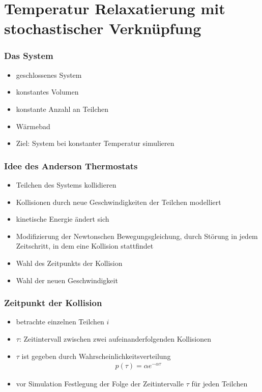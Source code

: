 \documentclass{beamer}
\begin{document}
\section{Temperatur Relaxatierung mit stochastischer Verknüpfung}
\begin{frame}
	\frametitle{Das System}
	\begin{itemize}
		\item geschlossenes System
		\item konstantes Volumen
		\item konstante Anzahl an Teilchen	
		\item Wärmebad
		\item Ziel: System bei konstanter Temperatur simulieren
	\end{itemize}
\end{frame}

\begin{frame} 
	\frametitle{Idee des Anderson Thermostats} 
	\begin{itemize}
		\item Teilchen des Systems kollidieren
		\item Kollisionen durch neue Geschwindigkeiten der Teilchen modelliert
		\item kinetische Energie ändert sich
		\item Modifizierung der Newtonschen Bewegungsgleichung, durch Störung  in jedem Zeitschritt, in dem eine Kollision stattfindet
		\item Wahl des Zeitpunkts der Kollision
		\item Wahl der neuen Geschwindigkeit
	\end{itemize}
\end{frame}

\begin{frame} 
	\frametitle{Zeitpunkt der Kollision}
	\begin{itemize}
		\item betrachte einzelnen Teilchen $i$
		\item $\tau$: Zeitintervall zwischen zwei aufeinanderfolgenden Kollisionen
		\item $\tau$ ist gegeben durch Wahrscheinlichkeitsverteilung
		\begin{align*}
		p(\tau)= \alpha e^{- \alpha \tau}
		\end{align*}
		\item vor Simulation Festlegung der Folge der Zeitintervalle $\tau$ für jeden Teilchen
	\end{itemize} 
\end{frame}
\end{document}
